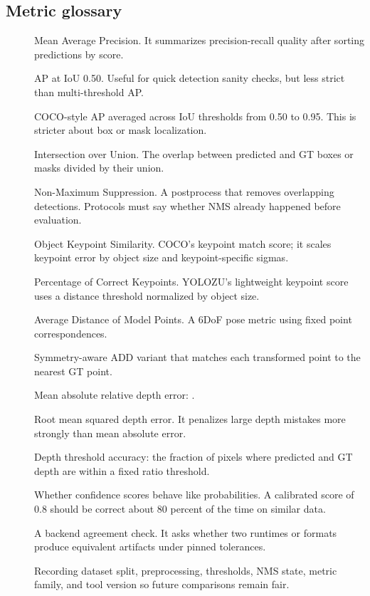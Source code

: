\subsection{Metric glossary}
\begin{description}
  \item[] Mean Average Precision. It summarizes precision-recall quality after sorting predictions by score.
  \item[] AP at IoU 0.50. Useful for quick detection sanity checks, but less strict than multi-threshold AP.
  \item[] COCO-style AP averaged across IoU thresholds from 0.50 to 0.95. This is stricter about box or mask localization.
  \item[] Intersection over Union. The overlap between predicted and GT boxes or masks divided by their union.
  \item[] Non-Maximum Suppression. A postprocess that removes overlapping detections. Protocols must say whether NMS already happened before evaluation.
  \item[] Object Keypoint Similarity. COCO's keypoint match score; it scales keypoint error by object size and keypoint-specific sigmas.
  \item[] Percentage of Correct Keypoints. YOLOZU's lightweight keypoint score uses a distance threshold normalized by object size.
  \item[] Average Distance of Model Points. A 6DoF pose metric using fixed point correspondences.
  \item[] Symmetry-aware ADD variant that matches each transformed point to the nearest GT point.
  \item[] Mean absolute relative depth error: .
  \item[] Root mean squared depth error. It penalizes large depth mistakes more strongly than mean absolute error.
  \item[] Depth threshold accuracy: the fraction of pixels where predicted and GT depth are within a fixed ratio threshold.
  \item[] Whether confidence scores behave like probabilities. A calibrated score of 0.8 should be correct about 80 percent of the time on similar data.
  \item[] A backend agreement check. It asks whether two runtimes or formats produce equivalent artifacts under pinned tolerances.
  \item[] Recording dataset split, preprocessing, thresholds, NMS state, metric family, and tool version so future comparisons remain fair.
\end{description}

